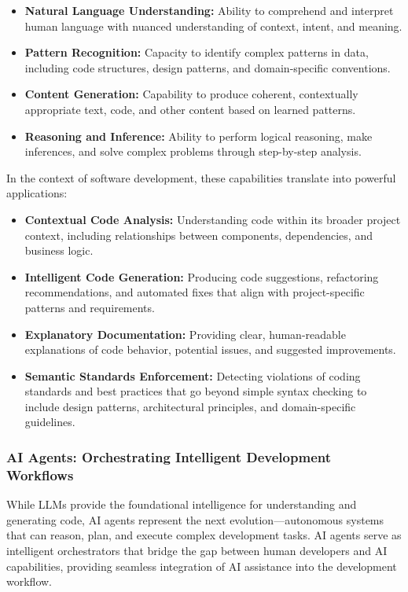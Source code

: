 \begin{spacing}{1.2}
\begin{itemize}
    \item \textbf{Natural Language Understanding:} Ability to comprehend and interpret human language with nuanced understanding of context, intent, and meaning.
    \item \textbf{Pattern Recognition:} Capacity to identify complex patterns in data, including code structures, design patterns, and domain-specific conventions.
    \item \textbf{Content Generation:} Capability to produce coherent, contextually appropriate text, code, and other content based on learned patterns.
    \item \textbf{Reasoning and Inference:} Ability to perform logical reasoning, make inferences, and solve complex problems through step-by-step analysis.
\end{itemize}

In the context of software development, these capabilities translate into powerful applications:

\begin{itemize}
    \item \textbf{Contextual Code Analysis:} Understanding code within its broader project context, including relationships between components, dependencies, and business logic.
    \item \textbf{Intelligent Code Generation:} Producing code suggestions, refactoring recommendations, and automated fixes that align with project-specific patterns and requirements.
    \item \textbf{Explanatory Documentation:} Providing clear, human-readable explanations of code behavior, potential issues, and suggested improvements.
    \item \textbf{Semantic Standards Enforcement:} Detecting violations of coding standards and best practices that go beyond simple syntax checking to include design patterns, architectural principles, and domain-specific guidelines.
\end{itemize}

\subsubsection*{AI Agents: Orchestrating Intelligent Development Workflows}

While LLMs provide the foundational intelligence for understanding and generating code, AI agents represent the next evolution—autonomous systems that can reason, plan, and execute complex development tasks. AI agents serve as intelligent orchestrators that bridge the gap between human developers and AI capabilities, providing seamless integration of AI assistance into the development workflow.


\end{spacing}
